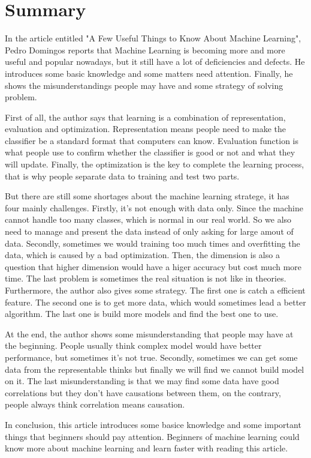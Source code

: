 \documentclass[12pt]{article}
\begin{document}
	\section{Summary}
		\par\qquad In the article entitled "A Few Useful Things to Know About Machine Learning", Pedro Domingos reports that Machine Learning is becoming more and more useful and popular nowadays, but it still have a lot of deficiencies and defects. He introduces some basic knowledge and  some matters need attention. Finally, he shows the misunderstandings people may have and some strategy of solving problem.
		\par First of all, the author says that learning is a combination of representation, evaluation and optimization. Representation means people need to make the classifier be a standard format that computers can know. Evaluation function is what people use to confirm whether the classifier is good or not and what they will update. Finally, the optimization is the key to complete the learning process, that is why people separate data to training and test two parts.
        \par But there are still some shortages about the machine learning stratege, it has four mainly challenges. Firstly, it's not enough with data only. Since the machine cannot handle too many classes, which is normal in our real world. So we also need to manage and present the data instead of only asking for large amout of data. Secondly, sometimes we would training too much times and overfitting the data, which is caused by a bad optimization. Then, the dimension is also a question that higher dimension would have a higer accuracy but cost much more time. The last problem is sometimes the real situation is not like in theories. Furthermore, the author also gives some strategy. The first one is catch a efficient feature. The second one is to get more data, which would sometimes lead a better algorithm. The last one is build more models and find the best one to use.
        \par At the end, the author shows some misunderstanding that people may have at the beginning. People usually think complex model would have better performance, but sometimes it's not true. Secondly, sometimes we can get some data from the representable thinks but finally we will find we cannot build model on it. The last misunderstanding is that we may find some data have good correlations but they don't have causations between them, on the contrary, people always think correlation means causation.
        \par In conclusion, this article introduces some basice knowledge and some important things that beginners should pay attention. Beginners of machine learning could know more about machine learning and learn faster with reading this article.
\end{document}
